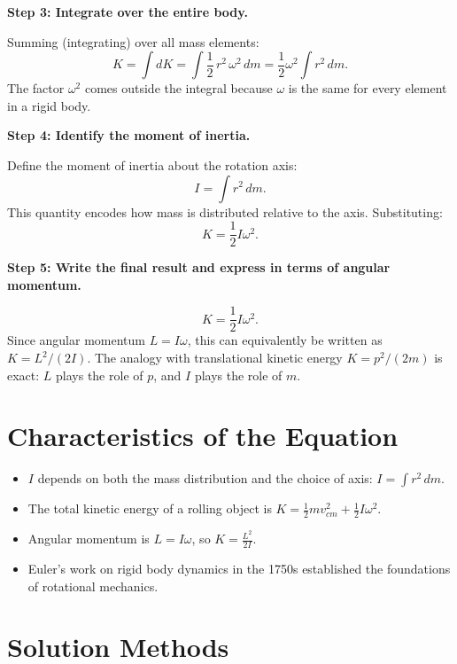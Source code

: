 \textbf{Step 3: Integrate over the entire body.}

Summing (integrating) over all mass elements:
\begin{equation}
K = \int dK = \int \frac{1}{2}\,r^2\,\omega^2\,dm = \frac{1}{2}\omega^2\int r^2\,dm.
\end{equation}
The factor $\omega^2$ comes outside the integral because $\omega$ is the same for every element in a rigid body.

\textbf{Step 4: Identify the moment of inertia.}

Define the moment of inertia about the rotation axis:
\begin{equation}
I = \int r^2\,dm.
\end{equation}
This quantity encodes how mass is distributed relative to the axis. Substituting:
\begin{equation}
K = \frac{1}{2}I\omega^2.
\end{equation}

\textbf{Step 5: Write the final result and express in terms of angular momentum.}

\begin{equation}
\boxed{K = \frac{1}{2}I\omega^2.}
\end{equation}
Since angular momentum $L = I\omega$, this can equivalently be written as $K = L^2/(2I)$. The analogy with translational kinetic energy $K = p^2/(2m)$ is exact: $L$ plays the role of $p$, and $I$ plays the role of $m$.

\section*{Characteristics of the Equation}

\begin{itemize}
    \item $I$ depends on both the mass distribution and the choice of axis: $I = \int r^2\,dm$.
    \item The total kinetic energy of a rolling object is $K = \frac{1}{2}mv_{cm}^2 + \frac{1}{2}I\omega^2$.
    \item Angular momentum is $L = I\omega$, so $K = \frac{L^2}{2I}$.
    \item Euler's work on rigid body dynamics in the 1750s established the foundations of rotational mechanics.
\end{itemize}
\section*{Solution Methods}

